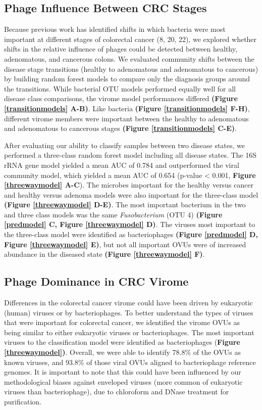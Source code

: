 \documentclass[12pt,]{article}
\begin{document}
\subsection{Phage Influence Between CRC
Stages}\label{phage-influence-between-crc-stages}

Because previous work has identified shifts in which bacteria were most
important at different stages of colorectal cancer (8, 20, 22), we
explored whether shifts in the relative influence of phages could be
detected between healthy, adenomatous, and cancerous colons. We
evaluated community shifts between the disease stage transitions
(healthy to adenomatous and adenomatous to cancerous) by building random
forest models to compare only the diagnosis groups around the
transitions. While bacterial OTU models performed equally well for all
disease class comparisons, the virome model performances differed
\textbf{(Figure \ref{transitionmodels} A-B)}. Like bacteria
\textbf{(Figure \ref{transitionmodels} F-H)}, different virome members
were important between the healthy to adenomatous and adenomatous to
cancerous stages \textbf{(Figure \ref{transitionmodels} C-E)}.

After evaluating our ability to classify samples between two disease
states, we performed a three-class random forest model including all
disease states. The 16S rRNA gene model yielded a mean AUC of 0.784 and
outperformed the viral community model, which yielded a mean AUC of
0.654 (p-value \textless{} 0.001, \textbf{Figure \ref{threewaymodel}
A-C}). The microbes important for the healthy versus cancer and healthy
versus adenoma models were also important for the three-class model
\textbf{(Figure \ref{threewaymodel} D-E)}. The most important bacterium
in the two and three class models was the same \emph{Fusobacterium} (OTU
4) \textbf{(Figure \ref{predmodel} C, Figure \ref{threewaymodel} D)}.
The viruses most important to the three-class model were identified as
bacteriophages \textbf{(Figure \ref{predmodel} D, Figure
\ref{threewaymodel} E)}, but not all important OVUs were of increased
abundance in the diseased state \textbf{(Figure \ref{threewaymodel} F)}.

\subsection{Phage Dominance in CRC
Virome}\label{phage-dominance-in-crc-virome}

Differences in the colorectal cancer virome could have been driven by
eukaryotic (human) viruses or by bacteriophages. To better understand
the types of viruses that were important for colorectal cancer, we
identified the virome OVUs as being similar to either eukaryotic viruses
or bacteriophages. The most important viruses to the classification
model were identified as bacteriophages (\textbf{Figure
\ref{threewaymodel})}. Overall, we were able to identify 78.8\% of the
OVUs as known viruses, and 93.8\% of those viral OVUs aligned to
bacteriophage reference genomes. It is important to note that this could
have been influenced by our methodological biases against enveloped
viruses (more common of eukaryotic viruses than bacteriophage), due to
chloroform and DNase treatment for purification.
\end{document}
